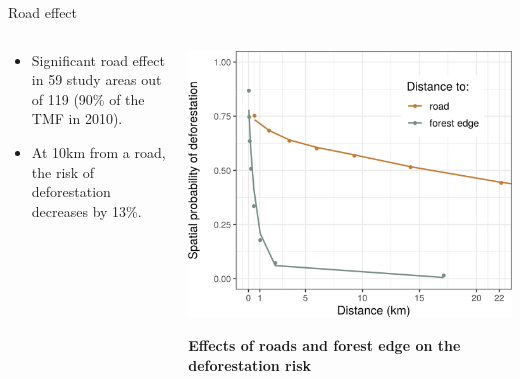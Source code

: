 \documentclass[10pt,table,dvipsnames,compress]{beamer}
\begin{document}
\begin{frame}[label={sec:orgcb55f1c}]{Road effect}
\begin{columns}
\begin{column}{0.5\columnwidth}
\begin{itemize}
\item Significant road effect in 59 study areas out of 119 (90\% of the TMF
in 2010).
\item At 10km from a road, the risk of deforestation decreases by 13\%.
\end{itemize}
\end{column}

\begin{column}{0.5\columnwidth}
\includegraphics[width=\textwidth]{figs/article/proba-roads}

\textbf{Effects of roads and forest edge on the deforestation risk}
\end{column}
\end{columns}
\end{frame}
\end{document}
